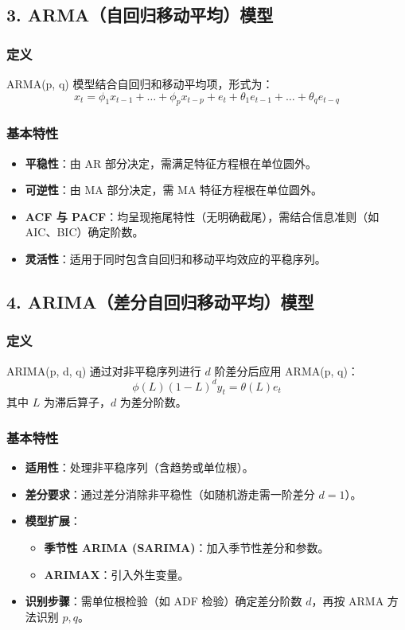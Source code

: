 \subsection*{3. ARMA（自回归移动平均）模型}

\subsubsection*{定义}
ARMA(p, q) 模型结合自回归和移动平均项，形式为：
\[
x_t = \phi_1 x_{t-1} + \dots + \phi_p x_{t-p} + e_t + \theta_1 e_{t-1} + \dots + \theta_q e_{t-q}
\]

\subsubsection*{基本特性}
\begin{itemize}
    \item \textbf{平稳性}：由 AR 部分决定，需满足特征方程根在单位圆外。
    \item \textbf{可逆性}：由 MA 部分决定，需 MA 特征方程根在单位圆外。
    \item \textbf{ACF 与 PACF}：均呈现拖尾特性（无明确截尾），需结合信息准则（如 AIC、BIC）确定阶数。
    \item \textbf{灵活性}：适用于同时包含自回归和移动平均效应的平稳序列。
\end{itemize}

\subsection*{4. ARIMA（差分自回归移动平均）模型}

\subsubsection*{定义}
ARIMA(p, d, q) 通过对非平稳序列进行 \(d\) 阶差分后应用 ARMA(p, q)：
\[
\phi(L)(1 - L)^d y_t = \theta(L) e_t
\]
其中 \(L\) 为滞后算子，\(d\) 为差分阶数。

\subsubsection*{基本特性}
\begin{itemize}
    \item \textbf{适用性}：处理非平稳序列（含趋势或单位根）。
    \item \textbf{差分要求}：通过差分消除非平稳性（如随机游走需一阶差分 \(d=1\)）。
    \item \textbf{模型扩展}：
    \begin{itemize}
        \item \textbf{季节性 ARIMA (SARIMA)}：加入季节性差分和参数。
        \item \textbf{ARIMAX}：引入外生变量。
    \end{itemize}
    \item \textbf{识别步骤}：需单位根检验（如 ADF 检验）确定差分阶数 \(d\)，再按 ARMA 方法识别 \(p, q\)。
\end{itemize}

